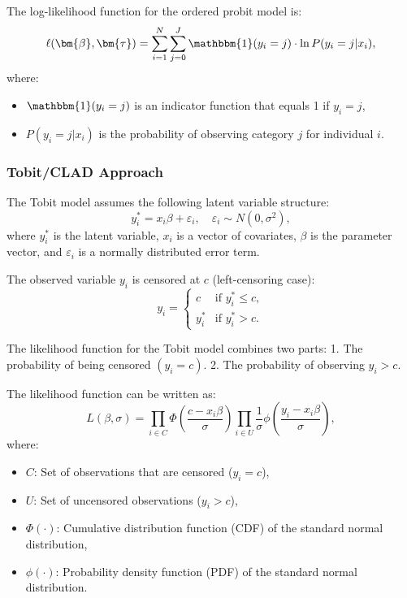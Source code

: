 The log-likelihood function for the ordered probit model is:
\[
\ell(\bm{\beta}, \bm{\tau}) = \sum_{i=1}^N \sum_{j=0}^J \mathbbm{1}(y_i = j) \cdot \ln P(y_i = j | x_i),
\]
where:
\begin{itemize}
    \item \( \mathbbm{1}(y_i = j) \) is an indicator function that equals 1 if \( y_i = j \),
    \item \( P(y_i = j | x_i) \) is the probability of observing category \( j \) for individual \( i \).
\end{itemize}

\subsubsection{Tobit/CLAD Approach}
The Tobit model assumes the following latent variable structure:
\[
y_i^* = x_i \beta + \varepsilon_i, \quad \varepsilon_i \sim N(0, \sigma^2),
\]
where \( y_i^* \) is the latent variable, \( x_i \) is a vector of covariates, \( \beta \) is the parameter vector, and \( \varepsilon_i \) is a normally distributed error term.

The observed variable \( y_i \) is censored at \( c \) (left-censoring case):
\[
y_i = 
\begin{cases}
c & \text{if } y_i^* \leq c, \\
y_i^* & \text{if } y_i^* > c.
\end{cases}
\]

The likelihood function for the Tobit model combines two parts:
1. The probability of being censored \( (y_i = c) \).
2. The probability of observing \( y_i > c \).

The likelihood function can be written as:
\[
L(\beta, \sigma) = \prod_{i \in C} \Phi\left( \frac{c - x_i \beta}{\sigma} \right) 
\prod_{i \in U} \frac{1}{\sigma} \phi\left( \frac{y_i - x_i \beta}{\sigma} \right),
\]
where:
\begin{itemize}
    \item \( C \): Set of observations that are censored (\( y_i = c \)),
    \item \( U \): Set of uncensored observations (\( y_i > c \)),
    \item \( \Phi(\cdot) \): Cumulative distribution function (CDF) of the standard normal distribution,
    \item \( \phi(\cdot) \): Probability density function (PDF) of the standard normal distribution.
\end{itemize}

